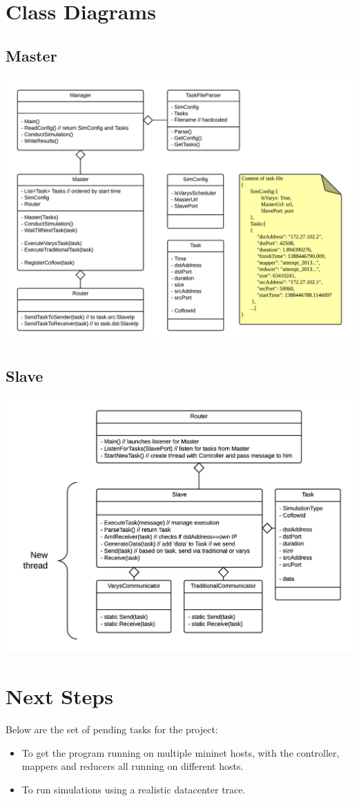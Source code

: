 \documentclass{article}
\begin{document}
\section{Class Diagrams}
\subsection{Master}
\includegraphics[scale = 0.75]{master.png}
\subsection{Slave}
\includegraphics[scale = 0.75]{slave.png}

\section{Next Steps}
Below are the set of pending tasks for the project:
\begin{itemize}
	\item To get the program running on multiple mininet hosts, with the controller, mappers and reducers all running on different hosts.
	\item To run simulations using a realistic datacenter trace.
\end{itemize}
\end{document}
